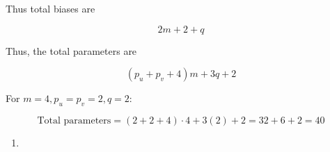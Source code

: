 \documentclass[
]{article}
\providecommand{\tightlist}{%
  \setlength{\itemsep}{0pt}\setlength{\parskip}{0pt}}
\begin{document}
Thus total biases are

\vspace{0.2cm}

\[
2m + 2 + q
\]

Thus, the total parameters are

\[
(p_u + p_v + 4)m + 3q + 2
\]

For \(m=4, p_u=p_v=2, q=2:\)

\[
\text{Total parameters} = (2+2+4)\cdot4 + 3(2) + 2 = 32 + 6 + 2 = 40
\]

\begin{enumerate}
\def\labelenumi{\alph{enumi}.}
\setcounter{enumi}{6}
\tightlist
\item
\end{enumerate}
\end{document}
